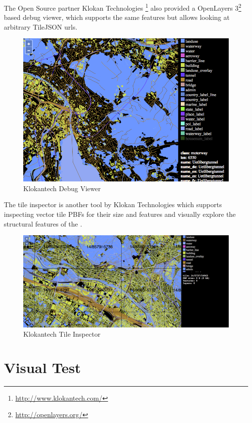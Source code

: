 The Open Source partner Klokan Technologies \footnote{\url{http://www.klokantech.com/}} also provided a OpenLayers 3\footnote{\url{http://openlayers.org/}} based debug viewer,
which supports the same features but allows looking at arbitrary TileJSON urls.

\begin{figure}[H]
  \includegraphics[width=1\textwidth]{images/klokantech_debug_viewer.png}
  \caption{Klokantech Debug Viewer}
\end{figure}
The tile inspector is another tool by Klokan Technologies which supports inspecting vector tile PBFs for their size and features and visually explore the structural features of the .

\begin{figure}[H]
  \includegraphics[width=1\textwidth]{images/klokantech_tile_inspector.png}
  \caption{Klokantech Tile Inspector}
\end{figure}



\section{Visual Test}

